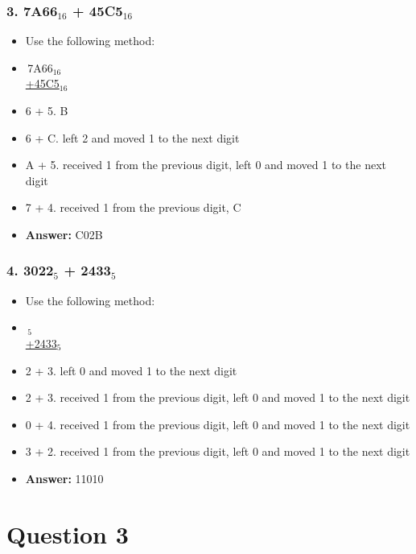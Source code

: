 \documentclass[11pt, oneside]{article}
\begin{document}
\subsubsection*{3. 7A66$_{16}$ + 45C5$_{16}$}

\begin{itemize}
    \item Use the following method:
    \item \,\;\;7A66$_{16}$ \\\underline{+45C5$_{16}$}
    \item 6 + 5. B
    \item 6 + C. left 2 and moved 1 to the next digit
    \item A + 5. received 1 from the previous digit, left 0 and moved 1 to the next digit
    \item 7 + 4. received 1 from the previous digit, C
    \item \textbf{Answer:} C02B
\end{itemize}

\pagebreak

\subsubsection*{4. 3022$_{5}$ + 2433$_{5}$}

\begin{itemize}
    \item Use the following method:
    \item \,\;$_{5}$ \\\underline{+2433$_{5}$}
    \item 2 + 3. left 0 and moved 1 to the next digit
    \item 2 + 3. received 1 from the previous digit, left 0 and moved 1 to the next digit
    \item 0 + 4. received 1 from the previous digit, left 0 and moved 1 to the next digit
    \item 3 + 2. received 1 from the previous digit, left 0 and moved 1 to the next digit
    \item \textbf{Answer:} 11010
\end{itemize}

\pagebreak

\section*{Question 3}
\end{document}
